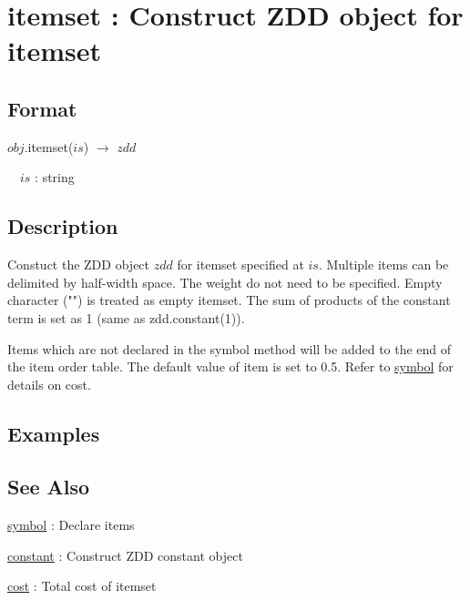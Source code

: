 
\section{itemset : Construct ZDD object for itemset\label{sect:itemset}}
\subsection*{Format}
$obj$.itemset($is$) $\rightarrow$ $zdd$

~~$is$ : string

\subsection*{Description}
Constuct the ZDD object $zdd$ for itemset specified at $is$. 
Multiple items can be delimited by half-width space. 
The weight do not need to be specified.  
Empty character ("") is treated as empty itemset. The sum of products of the constant term is set as 1 (same as zdd.constant(1)).  

Items which are not declared in the symbol method will be added to the end of the item order table.  
The default value of item is set to 0.5. 
Refer to \hyperref[sect:symbol]{symbol} for details on cost. 


\subsection*{Examples}


\subsection*{See Also}
\hyperref[sect:symbol]{symbol} : Declare items

\hyperref[sect:constant]{constant} : Construct ZDD constant object

\hyperref[sect:cost]{cost} : Total cost of itemset 


